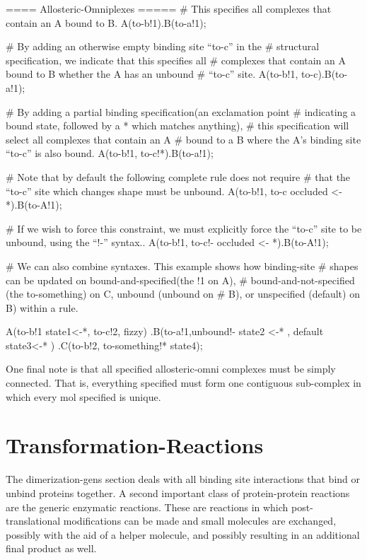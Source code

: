 \begin{ExampleMZR}
==== Allosteric-Omniplexes =====
  # This specifies all complexes that contain an A bound to B.
  A(to-b!1).B(to-a!1);

  # By adding an otherwise empty binding site ``to-c'' in the
  # structural specification, we indicate that this specifies all
  # complexes that contain an A bound to B whether the A has an unbound
  # ``to-c'' site.
  A(to-b!1, to-c).B(to-a!1);


  # By adding a partial binding specification(an exclamation point
  # indicating a bound state, followed by a * which matches anything),
  # this specification will select all complexes that contain an A
  # bound to a B where the A's binding site ``to-c'' is also bound.
  A(to-b!1, to-c!*).B(to-a!1);

  # Note that by default the following complete rule does not require
  # that the ``to-c'' site which changes shape must be unbound.  
  A(to-b!1, to-c {occluded <- *}).B(to-A!1);

  # If we wish to force this constraint, we must explicitly force the
  ``to-c'' site to be unbound, using the ``!-'' syntax..
  A(to-b!1, to-c!- {occluded <- *}).B(to-A!1);

  # We can also combine syntaxes.  This example shows how binding-site
  # shapes can be updated on bound-and-specified(the !1 on A),
  # bound-and-not-specified (the to-something) on C, unbound (unbound on
  # B), or unspecified (default) on B) within a rule.

  A(to-b!1 {state1<-*}, to-c!2, fizzy) 
  .B(to-a!1,unbound!- {state2 <-* }, default {state3<-*} ) 
  .C(to-b!2, to-something!* {state4});

\end{ExampleMZR}

One final note is that all specified allosteric-omni complexes must be
simply connected.  That is, everything specified must form one contiguous
sub-complex in which every mol specified is unique.


 \section{Transformation-Reactions}
 The dimerization-gens section deals with all binding site interactions that bind
 or unbind proteins together.  A second important class of
 protein-protein reactions are the generic enzymatic reactions.  These
 are reactions in
 which post-translational modifications can be made and small molecules are
 exchanged, possibly with the aid of a helper molecule, and possibly
 resulting in an additional final product as well.

